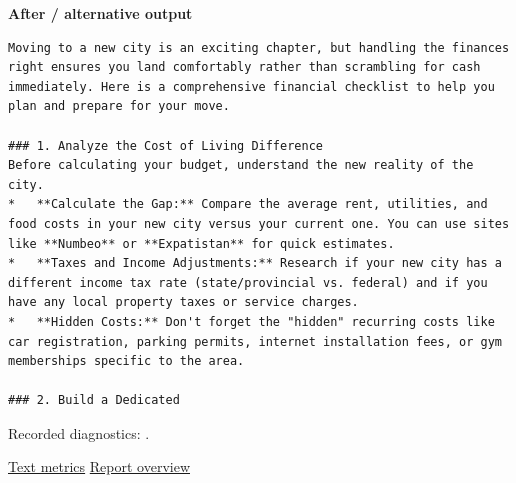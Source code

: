 \textbf{After / alternative output}

\begin{Verbatim}
Moving to a new city is an exciting chapter, but handling the finances right ensures you land comfortably rather than scrambling for cash immediately. Here is a comprehensive financial checklist to help you plan and prepare for your move.

### 1. Analyze the Cost of Living Difference
Before calculating your budget, understand the new reality of the city.
*   **Calculate the Gap:** Compare the average rent, utilities, and food costs in your new city versus your current one. You can use sites like **Numbeo** or **Expatistan** for quick estimates.
*   **Taxes and Income Adjustments:** Research if your new city has a different income tax rate (state/provincial vs. federal) and if you have any local property taxes or service charges.
*   **Hidden Costs:** Don't forget the "hidden" recurring costs like car registration, parking permits, internet installation fees, or gym memberships specific to the area.

### 2. Build a Dedicated
\end{Verbatim}

Recorded diagnostics:
\texttt{}.

\href{records/docs/watermarking/text.tex}{Text metrics} \textbar{}
\href{../docs/watermarking/README.md}{Report overview}
